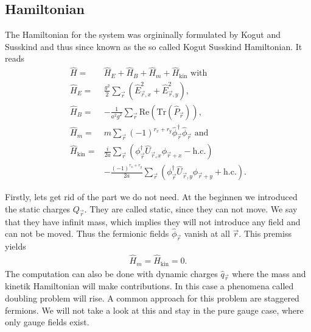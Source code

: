 \subsection{Hamiltonian}
The Hamiltonian for the system was orgininally formulated by Kogut and Susskind \cite{PhysRevD.11.395} and thus since known as the so called Kogut Susskind Hamiltonian. It reads
\begin{align*}
	\hat{H}            = & \hat{H}_E+\hat{H}_B+\hat{H}_m+\hat{H}_{\text{kin}}\text{ with}                                                              \\
	\hat{H}_E          = & \frac{g^2}{2}\sum_{\vec{r}} \left(\hat{E}^2_{\vec{r},x}+\hat{E}^2_{\vec{r},y}\right),                                       \\
  \hat{H}_B          = & -\frac{1}{a^2g^2}\sum_{\vec{r}} \text{Re}(\text{Tr}(\hat{P}_{\vec{r}})),                                     \\
	\hat{H}_m          = & m\sum_{\vec{r}}(-1)^{r_x+r_y}\hat{\phi}^{\dag}_{\vec{r}}\hat{\phi}_{\vec{r}}\text{ and}                                     \\
	\hat{H}_\text{kin} = & \frac{i}{2a}\sum_{\vec{r}}\left(\phi^{\dag}_{\vec{r}}\hat{U}_{\vec{r}, x}\phi_{\vec{r}+x}-\text{h.c.}\right)                \\
	                     & -\frac{(-1)^{r_x+r_y}}{2a}\sum_{\vec{r}}\left(\phi^{\dag}_{\vec{r}}\hat{U}_{\vec{r}, y}\phi_{\vec{r}+y}+\text{h.c.}\right).
\end{align*}

Firstly, lets get rid of the part we do not need. At the beginnen we introduced the static charges $Q_{\vec{r}}$. They are called static, since they can not move. We say that they have infinit mass, which implies they will not introduce any field and can not be moved. Thus the fermionic fields $\hat{\phi}_{\vec{r}}$ vanish at all $\vec{r}$. This premiss yields
\begin{align*}
	\hat{H}_{m}=\hat{H}_{\text{kin}}=0.
\end{align*}
The computation can also be done with dynamic charges $\hat{q}_{\vec{r}}$ where the mass and kinetik Hamiltonian will make contributions. In this case a phenomena called doubling problem will rise. A common approach for this problem are staggered fermions. We will not take a look at this and stay in the pure gauge case, where only gauge fields exist.

